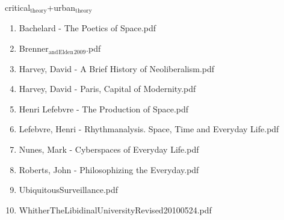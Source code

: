 \documentclass[11pt]{article}
\begin{document}
\item critical$_{\text{theory}}$+urban$_{\text{theory}}$
\label{sec-1-1-1-1-11-20}
\begin{enumerate}
\item Bachelard - The Poetics of Space.pdf
\label{sec-1-1-1-1-11-20-1}

\item Brenner$_{\text{and}}$$_{\text{Elden}}$$_{\text{2009}}$.pdf
\label{sec-1-1-1-1-11-20-2}

\item Harvey, David - A Brief History of Neoliberalism.pdf
\label{sec-1-1-1-1-11-20-3}

\item Harvey, David - Paris, Capital of Modernity.pdf
\label{sec-1-1-1-1-11-20-4}

\item Henri Lefebvre - The Production of Space.pdf
\label{sec-1-1-1-1-11-20-5}

\item Lefebvre, Henri - Rhythmanalysis. Space, Time and Everyday Life.pdf
\label{sec-1-1-1-1-11-20-6}

\item Nunes, Mark - Cyberspaces of Everyday Life.pdf
\label{sec-1-1-1-1-11-20-7}

\item Roberts, John - Philosophizing the Everyday.pdf
\label{sec-1-1-1-1-11-20-8}

\item UbiquitousSurveillance.pdf
\label{sec-1-1-1-1-11-20-9}

\item WhitherTheLibidinalUniversityRevised20100524.pdf
\label{sec-1-1-1-1-11-20-10}
\end{enumerate}
\end{document}
